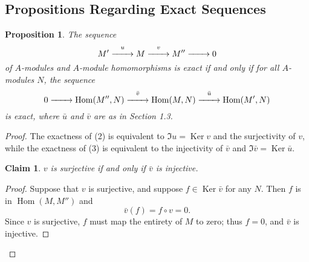 \documentclass[11pt]{article}
\newtheorem{proposition}{Proposition}
\newtheorem{claim}{Claim}
\newcommand{\Hom}{\operatorname{Hom}}
\newcommand{\Ker}{\operatorname{Ker}}
\renewcommand{\longrightarrow}{\xrightarrow{\hspace*{0.7cm}}}
\begin{document}

\subsection{Propositions Regarding Exact Sequences}

\begin{adjustwidth}{0.5cm}{}
	\begin{proposition}
		The sequence
		\begin{equation}
			M' \stackrel{u}{\longrightarrow} M \stackrel{v}{\longrightarrow} M'' \longrightarrow 0
		\end{equation}
		of $A$-modules and $A$-module homomorphisms is exact if and only if for all $A$-modules $N$, the sequence
		\begin{equation}
			0 \longrightarrow \Hom(M'', N) \stackrel{\bar{v}}{\longrightarrow} \Hom(M, N) \stackrel{\bar{u}}{\longrightarrow} \Hom(M', N)
		\end{equation}
		is exact, where $\bar{u}$ and $\bar{v}$ are as in Section 1.3.
	\end{proposition}
	\newpage
	\begin{proof}
		The exactness of (2) is equivalent to $\Im u = \Ker v$ and the surjectivity of $v$, while the exactness of (3) is equivalent to the injectivity of $\bar{v}$ and $\Im \bar{v} = \Ker \bar{u}$.
		\begin{adjustwidth}{0.5cm}{}
			\begin{claim}
				$v$ is surjective if and only if $\bar{v}$ is injective.
			\end{claim}
			\begin{proof}\renewcommand{\qedsymbol}{}
				Suppose that $v$ is surjective, and suppose $f \in \Ker \bar{v}$ for any $N$. Then $f$ is in $\Hom(M, M'')$ and
				\[
					\bar{v}(f) = f \circ v = 0.
				\]
				Since $v$ is surjective, $f$ must map the entirety of $M$ to zero; thus $f = 0$, and $\bar{v}$ is injective.


\end{proof}
\end{adjustwidth}
\end{proof}
\end{adjustwidth}
\end{document}
